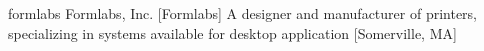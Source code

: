 \newglsXcompany%
{formlabs}%
{Formlabs, Inc.}%
[Formlabs]%
{A designer and manufacturer of  printers, specializing in  systems available for desktop application \cite{website:Formlabs}}%
[Somerville, MA]%